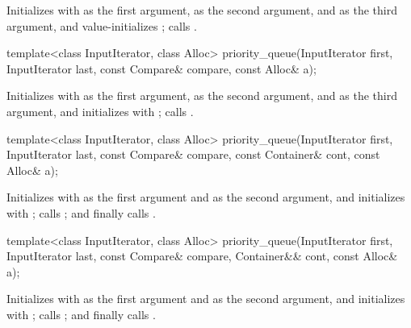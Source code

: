 \begin{itemdescr}
\pnum
\effects
Initializes  with
 as the first argument,
 as the second argument, and
 as the third argument, and
value-initializes ;
calls .
\end{itemdescr}

%
\begin{itemdecl}
template<class InputIterator, class Alloc>
  priority_queue(InputIterator first, InputIterator last, const Compare& compare, const Alloc& a);
\end{itemdecl}

\begin{itemdescr}
\pnum
\effects
Initializes  with
 as the first argument,
 as the second argument, and
 as the third argument, and
initializes  with ;
calls .
\end{itemdescr}

%
\begin{itemdecl}
template<class InputIterator, class Alloc>
  priority_queue(InputIterator first, InputIterator last, const Compare& compare,
                 const Container& cont, const Alloc& a);
\end{itemdecl}

\begin{itemdescr}
\pnum
\effects
Initializes  with
 as the first argument and  as the second argument, and
initializes  with ;
calls ; and
finally calls .
\end{itemdescr}

%
\begin{itemdecl}
template<class InputIterator, class Alloc>
  priority_queue(InputIterator first, InputIterator last, const Compare& compare, Container&& cont,
                 const Alloc& a);
\end{itemdecl}

\begin{itemdescr}
\pnum
\effects
Initializes  with
 as the first argument and
 as the second argument, and
initializes  with ;
calls ; and
finally calls .
\end{itemdescr}

